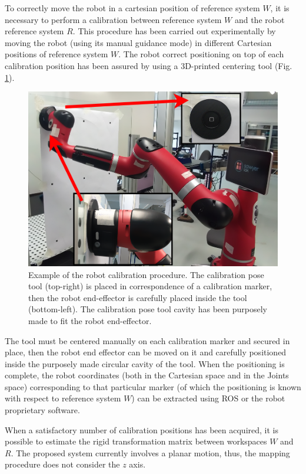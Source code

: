 \documentclass[a4paper, 10 pt, conference]{ieeeconf}      %
\begin{document}
To correctly move the robot in a cartesian position of reference system $W$, it is necessary to perform a calibration between reference system $W$ and the robot reference system $R$. This procedure has been carried out experimentally by moving the robot (using its manual guidance mode) in different Cartesian positions of reference system $W$. The robot correct positioning on top of each calibration position has been assured by using a 3D-printed centering tool (Fig. \ref{fig:robotcalib}). 

\begin{figure}[ht]
	\centering
	\includegraphics[width=1\columnwidth]{figures/robotcalibration}
	\caption{Example of the robot calibration procedure. The calibration pose tool (top-right) is placed in correspondence of a calibration marker, then the robot end-effector is carefully placed inside the tool (bottom-left). The calibration pose tool cavity has been purposely made to fit the robot end-effector.}
	\label{fig:robotcalib}
\end{figure}

The tool must be centered manually on each calibration marker and secured in place, then the robot end effector can be moved on it and carefully positioned inside the purposely made circular cavity of the tool. When the positioning is complete, the robot coordinates (both in the Cartesian space and in the Joints space) corresponding to that particular marker (of which the positioning is known with respect to reference system $W$) can be extracted using ROS or the robot proprietary software. 

When a satisfactory number of calibration positions has been acquired, it is possible to estimate the rigid transformation matrix between workspaces $W$ and $R$. The proposed system currently involves a planar motion, thus, the mapping procedure does not consider the $z$ axis.
\end{document}
